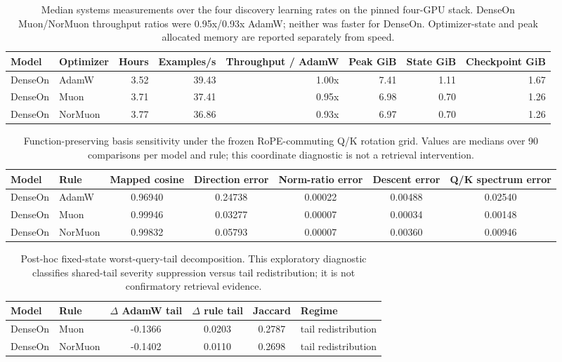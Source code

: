 \begin{table}[t]
\centering
\small
\begin{tabular}{llrrrrrr}
\toprule
Model & Optimizer & Hours & Examples/s & Throughput / AdamW & Peak GiB & State GiB & Checkpoint GiB \\
\midrule
DenseOn & AdamW & 3.52 & 39.43 & 1.00x & 7.41 & 1.11 & 1.67 \\
DenseOn & Muon & 3.71 & 37.41 & 0.95x & 6.98 & 0.70 & 1.26 \\
DenseOn & NorMuon & 3.77 & 36.86 & 0.93x & 6.97 & 0.70 & 1.26 \\
\bottomrule
\end{tabular}
\caption{Median systems measurements over the four discovery learning rates on the pinned four-GPU stack. DenseOn Muon/NorMuon throughput ratios were 0.95x/0.93x AdamW; neither was faster for DenseOn. Optimizer-state and peak allocated memory are reported separately from speed.}
\label{tab:training-systems-results}
\end{table}

\begin{table}[t]
\centering
\small
\begin{tabular}{llccccc}
\toprule
Model & Rule & Mapped cosine & Direction error & Norm-ratio error & Descent error & Q/K spectrum error \\
\midrule
DenseOn & AdamW & 0.96940 & 0.24738 & 0.00022 & 0.00488 & 0.02540 \\
DenseOn & Muon & 0.99946 & 0.03277 & 0.00007 & 0.00034 & 0.00148 \\
DenseOn & NorMuon & 0.99832 & 0.05793 & 0.00007 & 0.00360 & 0.00946 \\
\bottomrule
\end{tabular}
\caption{Function-preserving basis sensitivity under the frozen RoPE-commuting Q/K rotation grid. Values are medians over 90 comparisons per model and rule; this coordinate diagnostic is not a retrieval intervention.}
\label{tab:basis-sensitivity-results}
\end{table}

\begin{table}[t]
\centering
\small
\begin{tabular}{llcccl}
\toprule
Model & Rule & $\Delta$ AdamW tail & $\Delta$ rule tail & Jaccard & Regime \\
\midrule
DenseOn & Muon & -0.1366 & 0.0203 & 0.2787 & tail redistribution \\
DenseOn & NorMuon & -0.1402 & 0.0110 & 0.2698 & tail redistribution \\
\bottomrule
\end{tabular}
\caption{Post-hoc fixed-state worst-query-tail decomposition. This exploratory diagnostic classifies shared-tail severity suppression versus tail redistribution; it is not confirmatory retrieval evidence.}
\label{tab:tail-identity-results}
\end{table}


